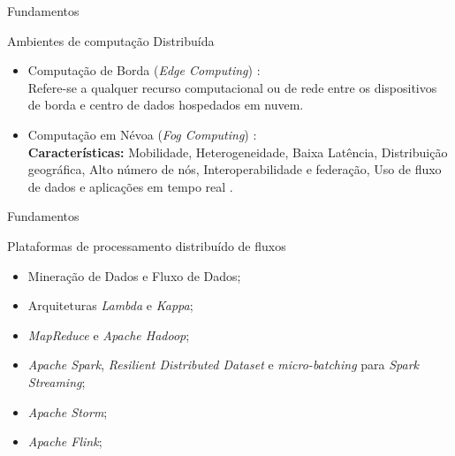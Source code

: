 \documentclass[aspectratio=43,10pt]{beamer}
\begin{document}
{%
\begin{frame}[fragile]{Fundamentos}
  \begin{alertblock}{Ambientes de computação Distribuída}
  \begin{itemize}
    
  \item Computação de Borda (\emph{Edge Computing}) \cite{Shi2016}:
  \\ Refere-se a qualquer recurso computacional ou de rede entre os dispositivos
  de borda e centro de dados hospedados em nuvem.
  
  \item Computação em Névoa (\emph{Fog Computing}) \cite{Bonomi2012,dastjerdi2016}:
  \\ \textbf{Características:}
  Mobilidade,
  Heterogeneidade,
  Baixa Latência,
  Distribuição geográfica,
  Alto número de nós,
  Interoperabilidade e federação,
  Uso de fluxo de dados e aplicações em tempo real
  \cite{IEEECommunicationsSociety2018}.
\end{itemize}
\end{alertblock}
\end{frame}
}


\begin{frame}[fragile]{Fundamentos}
\begin{alertblock}{Plataformas de processamento distribuído de fluxos}
  \begin{itemize}
    \item Mineração de Dados e Fluxo de Dados;
    \item Arquiteturas \emph{Lambda} e \emph{Kappa};
    \item \emph{MapReduce} e \emph{Apache Hadoop};
    \item \emph{Apache Spark}, \emph{Resilient Distributed Dataset} e
    \emph{micro-batching} para \emph{Spark Streaming};
    \item \emph{Apache Storm};
    \item \emph{Apache Flink};
  \end{itemize}
\end{alertblock}
\end{frame}
\end{document}
